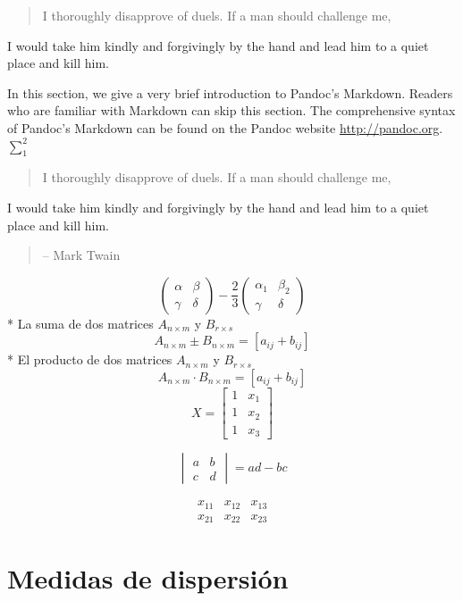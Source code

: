 \documentclass[
  10pt,
]{krantz}
\theoremstyle{definition}
\theoremstyle{definition}
\theoremstyle{definition}
\theoremstyle{definition}
\theoremstyle{remark}
\begin{document}
\begin{quote}
I thoroughly disapprove of duels. If a man should challenge me,
\end{quote}

I would take him kindly and forgivingly by the hand and lead him
to a quiet place and kill him.

In this section, we give a very brief introduction to Pandoc's Markdown. Readers who are familiar with Markdown can skip this section. The comprehensive syntax of Pandoc's Markdown can be found on the Pandoc website \url{http://pandoc.org}. \(\sum_1^2\)

\begin{quote}
I thoroughly disapprove of duels. If a man should challenge me,
\end{quote}

I would take him kindly and forgivingly by the hand and lead him
to a quiet place and kill him.

\begin{quote}
-- Mark Twain
\end{quote}

\[\begin{pmatrix}\alpha & \beta\\
\gamma & \delta
\end{pmatrix}-\frac{2}{3} \begin{pmatrix}\alpha_1 & \beta_2\\
\gamma & \delta
\end{pmatrix}\]
* La suma de dos matrices \(A_{n\times m}\) y \(B_{r\times s}\) \[A_{n\times m}\pm B_{n\times m}=[a_{ij}+b_{ij}]\]
* El producto de dos matrices \(A_{n\times m}\) y \(B_{r\times s}\) \[A_{n\times m}\cdot B_{n\times m}=[a_{ij}+b_{ij}]\]
\[X = \begin{bmatrix}1 & x_{1}\\
1 & x_{2}\\
1 & x_{3}
\end{bmatrix}\]

\[\begin{vmatrix}a & b\\
c & d
\end{vmatrix}=ad-bc\]

\[\begin{array}{ccc}
x_{11} & x_{12} & x_{13}\\
x_{21} & x_{22} & x_{23}
\end{array}\]

\hypertarget{medidas-de-dispersiuxf3n}{%
\chapter{Medidas de dispersión}\label{medidas-de-dispersiuxf3n}}
\end{document}
